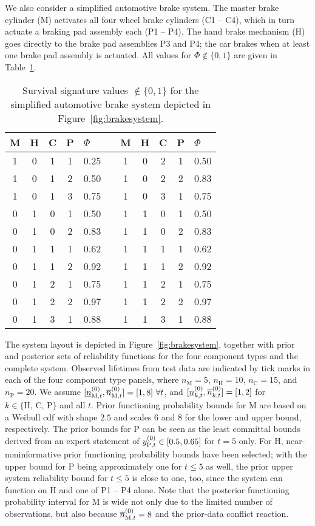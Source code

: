 \documentclass[12pt, a4paper]{elsarticle}
\begin{document}
We also consider a simplified automotive brake system.
The master brake cylinder (M) activates all four wheel brake cylinders (C1 -- C4),
which in turn actuate a braking pad assembly each (P1 -- P4).
The hand brake mechanism (H) goes directly to the brake pad assemblies P3 and P4;
the car brakes when at least one brake pad assembly is actuated.
All values for $\Phi \not\in \{0,1\}$ are given in Table~\ref{tab:brake-survsign}.
\begin{table}
\centering
\begin{tabular}{cccclcccccl}
  \toprule
M & H & C & P & $\Phi$ & \quad & M & H & C & P & $\Phi$\\ 
  \midrule
1 & 0 & 1 & 1 & 0.25 & & 1 & 0 & 2 & 1 & 0.50 \\ 
1 & 0 & 1 & 2 & 0.50 & & 1 & 0 & 2 & 2 & 0.83 \\ 
1 & 0 & 1 & 3 & 0.75 & & 1 & 0 & 3 & 1 & 0.75 \\ 
0 & 1 & 0 & 1 & 0.50 & & 1 & 1 & 0 & 1 & 0.50 \\ 
0 & 1 & 0 & 2 & 0.83 & & 1 & 1 & 0 & 2 & 0.83 \\ 
0 & 1 & 1 & 1 & 0.62 & & 1 & 1 & 1 & 1 & 0.62 \\ 
0 & 1 & 1 & 2 & 0.92 & & 1 & 1 & 1 & 2 & 0.92 \\ 
0 & 1 & 2 & 1 & 0.75 & & 1 & 1 & 2 & 1 & 0.75 \\ 
0 & 1 & 2 & 2 & 0.97 & & 1 & 1 & 2 & 2 & 0.97 \\ 
0 & 1 & 3 & 1 & 0.88 & & 1 & 1 & 3 & 1 & 0.88 \\ 
   \bottomrule
\end{tabular}
\caption{Survival signature values $\not\in \{0,1\}$ for the simplified automotive brake system depicted in Figure~\ref{fig:brakesystem}.
}
\label{tab:brake-survsign}
\end{table}
The system layout is depicted in Figure~\ref{fig:brakesystem},
together with prior and posterior sets of reliability functions for the four component types and the complete system.
Observed lifetimes from test data are indicated by tick marks in each of the four component type panels,
where $n_\text{M}=5$, $n_\text{H}=10$, $n_\text{C}=15$, and $n_\text{P}=20$.
We assume $[\underline{n}^{(0)}_{\text{M},t},\overline{n}^{(0)}_{\text{M},t}] = [1,8]\ \forall t$,
and $[\underline{n}^{(0)}_{k,t}, \overline{n}^{(0)}_{k,t}] = [1,2]$ for $k \in \{\text{H, C, P}\}$ and all $t$.
Prior functioning probability bounds for M are based on
a Weibull cdf with shape $2.5$ and scales $6$ and $8$ for the lower and upper bound, respectively.
The prior bounds for P can be seen as the least committal bounds
derived from an expert statement of $y^{(0)}_{\text{P},t} \in [0.5, 0.65]$ for $t=5$ only.
%
For H, near-noninformative prior functioning probability bounds have been selected;
with the upper bound for P being approximately one for $t \le 5$ as well,
the prior upper system reliability bound for $t \le 5$ is close to one, too,
since the system can function on H and one of P1 -- P4 alone.
Note that the posterior functioning probability interval for M
is wide not only due to the limited number of observations,
but also because $\overline{n}^{(0)}_{\text{M},t} = 8$ and the prior-data conflict reaction.
\end{document}
